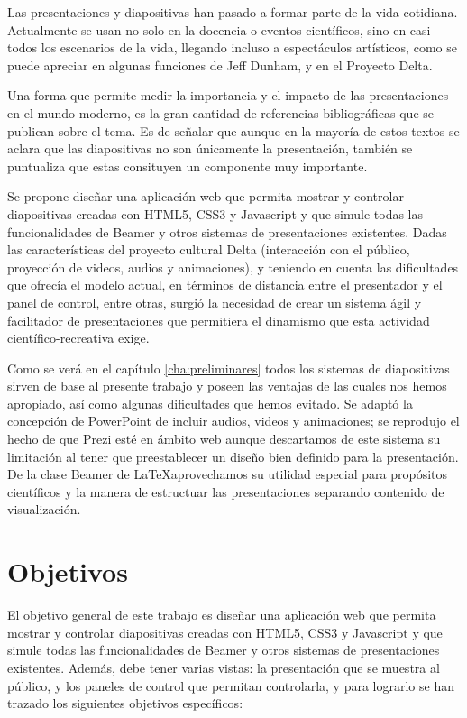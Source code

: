 
\begin{introduction}

	Las presentaciones y diapositivas han pasado a formar parte de la vida cotidiana. Actualmente se usan no solo en la docencia o eventos científicos, sino en casi todos los escenarios de la vida, llegando incluso a espectáculos artísticos, como se puede apreciar en algunas funciones de Jeff Dunham, y en el Proyecto Delta.


	Una forma que permite medir la importancia y el impacto de las presentaciones en el mundo moderno, es la gran cantidad de referencias bibliográficas que se publican sobre el tema. Es de señalar que aunque en la mayoría de estos textos se aclara que las diapositivas no son únicamente la presentación, también se puntualiza que estas consituyen un componente muy importante.

	Se propone diseñar una aplicación web que permita mostrar y controlar diapositivas creadas con HTML5, CSS3 y Javascript y que simule todas las funcionalidades de Beamer y otros sistemas de presentaciones existentes. Dadas las características del proyecto cultural Delta (interacción con el público, proyección de videos, audios y animaciones), y teniendo en cuenta las dificultades que ofrecía el modelo actual, en términos de distancia entre el presentador y el panel de control, entre otras, surgió la necesidad de crear un sistema ágil y facilitador de presentaciones que permitiera el dinamismo que esta actividad científico-recreativa exige.

	Como se verá en el capítulo \ref{cha:preliminares} todos los sistemas de diapositivas sirven de base al presente trabajo y poseen las ventajas de las cuales nos hemos apropiado, así como algunas dificultades que hemos evitado. Se adaptó la concepción de PowerPoint de incluir audios, videos y animaciones; se reprodujo el hecho de que Prezi esté en ámbito web aunque descartamos de este sistema su limitación al tener que preestablecer un diseño bien definido para la presentación. De la clase Beamer de \LaTeX  aprovechamos su utilidad especial para propósitos científicos y la manera de estructuar las presentaciones separando contenido de visualización.


	\section*{Objetivos}

		El objetivo general de este trabajo es diseñar una aplicación web que permita mostrar y controlar diapositivas creadas con HTML5, CSS3 y Javascript y que simule todas las funcionalidades de Beamer y otros sistemas de presentaciones existentes. Además, debe tener varias vistas: la presentación que se muestra al público, y los paneles de control que permitan controlarla, y para lograrlo se han trazado los siguientes objetivos específicos:


\end{introduction}
